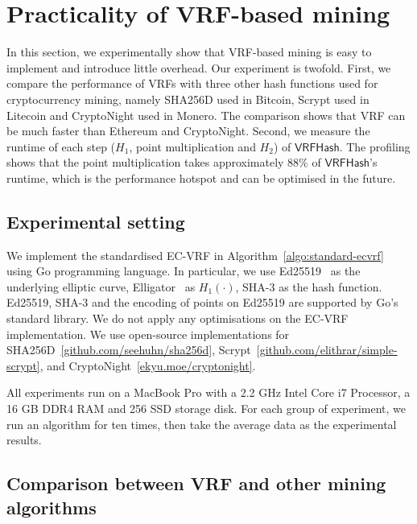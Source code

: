 \section{Practicality of VRF-based mining}
\label{sec:practicality}

In this section, we experimentally show that VRF-based mining is easy to implement and introduce little overhead.
Our experiment is twofold.
First, we compare the performance of VRFs with three other hash functions used for cryptocurrency mining, namely SHA256D used in Bitcoin, Scrypt used in Litecoin and CryptoNight used in Monero.
The comparison shows that VRF can be much faster than Ethereum and CryptoNight.
Second, we measure the runtime of each step ($H_1$, point multiplication and $H_2$) of $\mathsf{VRFHash}$.
The profiling shows that the point multiplication takes approximately 88\% of $\mathsf{VRFHash}$'s runtime, which is the performance hotspot and can be optimised in the future.

\subsection{Experimental setting}

We implement the standardised EC-VRF in Algorithm~\ref{algo:standard-ecvrf} using Go programming language.
In particular, we use Ed25519~\cite{bernstein2012high} as the underlying elliptic curve, Elligator~\cite{bernstein2013elligator} as $H_1(\cdot)$, SHA-3 as the hash function.
Ed25519, SHA-3 and the encoding of points on Ed25519 are supported by Go's standard library.
We do not apply any optimisations on the EC-VRF implementation.
We use open-source implementations for SHA256D~\ref{github.com/seehuhn/sha256d}, Scrypt~\ref{github.com/elithrar/simple-scrypt}, and CryptoNight~\ref{ekyu.moe/cryptonight}.

All experiments run on a MacBook Pro with a 2.2 GHz Intel Core i7 Processor, a 16 GB DDR4 RAM and 256 SSD storage disk.
For each group of experiment, we run an algorithm for ten times, then take the average data as the experimental results.




\subsection{Comparison between VRF and other mining algorithms}


